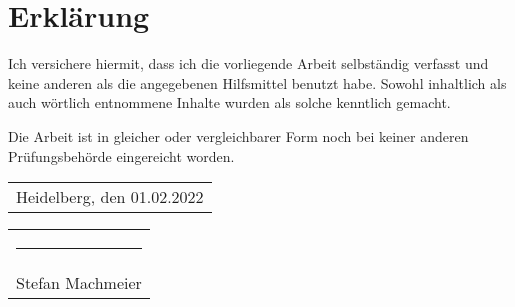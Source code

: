\thispagestyle{empty}
\setlength{\parindent}{0em}

\chapter*{Erklärung}
\thispagestyle{empty}

\vspace{3\baselineskip}
Ich versichere hiermit, dass ich die vorliegende Arbeit selbständig verfasst und keine anderen als die angegebenen Hilfsmittel benutzt habe. 
Sowohl inhaltlich als auch wörtlich entnommene Inhalte wurden als solche kenntlich gemacht.

Die Arbeit ist in gleicher oder vergleichbarer Form noch bei keiner anderen Prüfungsbehörde eingereicht worden.
\vspace{5\baselineskip}

\begin{tabular}[t]{c}
    Heidelberg, den 01.02.2022
\end{tabular}
\hfill
\begin{tabular}[t]{c}
    \rule{15em}{0.4pt} \\ Stefan Machmeier
\end{tabular}

